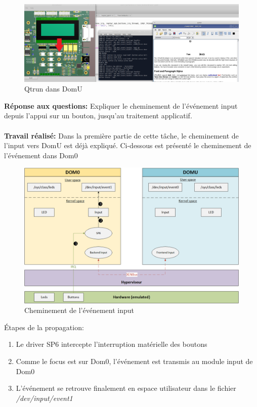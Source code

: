 \begin{figure}[H]
	\begin{center}
		\includegraphics[width=16cm]{img/dom03.png}
		\caption{Qtrun dans DomU}
		\label{qtrun3}
	\end{center}
\end{figure}
\textbf{Réponse aux questions: }Expliquer le cheminement de l'événement input depuis l'appui sur un bouton, jusqu'au traitement applicatif.\\\\
\textbf{Travail réalisé: }Dans la première partie de cette tâche, le cheminement de l'input vers DomU est déjà expliqué. Ci-dessous est présenté le cheminement de l'événement dans Dom0
\begin{figure}[H]
	\begin{center}
		\includegraphics[width=17cm]{img/virt2.png}
		\caption{Cheminement de l'événement input}
		\label{virt2}
	\end{center}
\end{figure}
Étapes de la propagation:
\begin{enumerate}
	\item Le driver SP6 intercepte l'interruption matérielle des boutons
	\item Comme le focus est sur Dom0, l'événement est transmis au module input de Dom0
	\item L'événement se retrouve finalement en espace utilisateur dans le fichier \textit{/dev/input/event1}
\end{enumerate}
